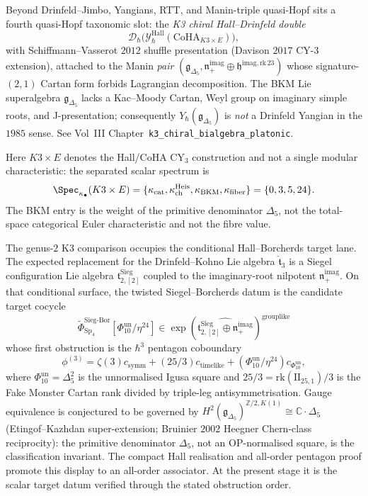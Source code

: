 \begin{remark}
\label{rem:ydk-hall-drinfeld}
Beyond Drinfeld--Jimbo, Yangians, RTT, and Manin-triple quasi-Hopf
sits a fourth quasi-Hopf taxonomic slot: the \emph{K3 chiral
Hall--Drinfeld double}
\[
 \mathcal{D}_\hbar\bigl(\mathcal{Y}^{\mathrm{Hall}}_\hbar(\mathrm{CoHA}_{K3 \times E})\bigr),
\]
with Schiffmann--Vasserot $2012$ shuffle presentation
\textup{(}Davison $2017$ CY-$3$ extension\textup{)}, attached to the
Manin \emph{pair}
$(\mathfrak{g}_{\Delta_5},\mathfrak{n}_+^{\mathrm{imag}}\oplus
\mathfrak{h}^{\mathrm{imag,rk\,23}})$ whose signature-$(2,1)$ Cartan
form forbids Lagrangian decomposition. The BKM Lie superalgebra
$\mathfrak{g}_{\Delta_5}$ lacks a Kac--Moody Cartan, Weyl group on
imaginary simple roots, and J-presentation; consequently
$Y_\hbar(\mathfrak{g}_{\Delta_5})$ is \emph{not} a Drinfeld Yangian in
the $1985$ sense. See Vol~III
Chapter~\texttt{k3\_chiral\_bialgebra\_platonic}.

Here $K3\times E$ denotes the Hall/CoHA CY$_3$ construction and not a
single modular characteristic: the separated scalar spectrum is
\[
\Spec_{\kappa_\bullet}(K3\times E)
=\{\kappa_{\mathrm{cat}},\kappa_{\mathrm{ch}}^{\mathrm{Heis}},
\kappa_{\mathrm{BKM}},\kappa_{\mathrm{fiber}}\}
=\{0,3,5,24\}.
\]
The BKM entry is the weight of the primitive denominator $\Delta_5$,
not the total-space categorical Euler characteristic and not the fibre
value.
\end{remark}

\begin{remark}
\label{rem:ydk-siegel-borcherds}
The genus-$2$ K3 comparison occupies the conditional Hall--Borcherds
target lane. The expected replacement for the Drinfeld--Kohno Lie algebra
$\widehat{\mathfrak{t}}_3$ is a Siegel configuration Lie algebra
$\mathfrak{t}^{\mathrm{Sieg}}_{2,[2]}$ coupled to the imaginary-root
nilpotent $\mathfrak{n}_+^{\mathrm{imag}}$. On that conditional
surface, the twisted Siegel--Borcherds datum is the candidate target
cocycle
\[
\widetilde{\Phi}^{\mathrm{Sieg\text{-}Bor}}_{\mathrm{Sp}_4}
[\Phi_{10}^{\mathrm{un}}/\eta^{24}]
\in
\exp(\widehat{\mathfrak{t}^{\mathrm{Sieg}}_{2,[2]}\oplus
\mathfrak{n}_+^{\mathrm{imag}}})^{\mathrm{grouplike}}
\]
whose first obstruction is the $\hbar^{3}$ pentagon coboundary
\[
\phi^{(3)}
=\zeta(3)c_{\mathrm{symm}}
+(25/3)c_{\mathrm{timelike}}
+(\Phi_{10}^{\mathrm{un}}/\eta^{24})c_{\Phi_{10}^{\mathrm{un}}},
\]
where $\Phi_{10}^{\mathrm{un}}=\Delta_5^2$ is the unnormalised Igusa
square and $25/3=\mathrm{rk}(\mathrm{II}_{25,1})/3$ is the Fake
Monster Cartan rank divided by triple-leg antisymmetrisation. Gauge
equivalence is conjectured to be governed by
$H^2(\mathfrak{g}_{\Delta_5})^{\mathbb{Z}/2,K(1)}
\cong\mathbb{C}\cdot\Delta_5$ (Etingof--Kazhdan super-extension;
Bruinier $2002$ Heegner Chern-class reciprocity): the primitive
denominator $\Delta_5$, not an OP-normalised square, is the
classification invariant.
The compact Hall realisation and all-order pentagon proof promote this
display to an all-order associator.  At the present stage it is the
scalar target datum verified through the stated obstruction order.
\end{remark}

